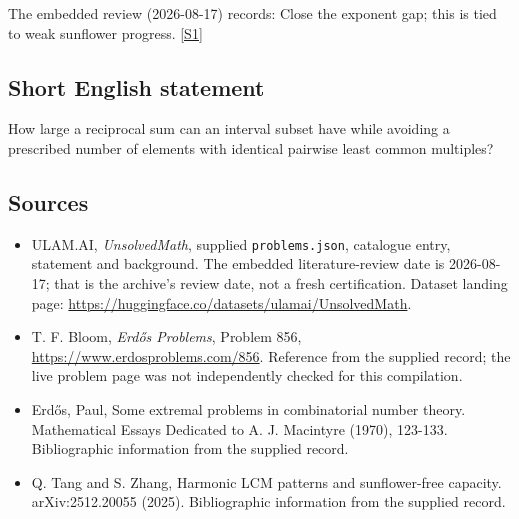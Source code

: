 \documentclass[11pt,a4paper]{article}
\newcommand{\sref}[2]{\hyperlink{source:#1:#2}{[S#2]}}
\begin{document}
The embedded review (2026-08-17) records: Close the exponent gap; this is tied to weak sunflower progress. \sref{statement}{1}

\subsection{Short English statement}

How large a reciprocal sum can an interval subset have while avoiding a prescribed number of elements with identical pairwise least common multiples?

\subsection{Sources}

{\small

\begin{itemize}

\item[\hypertarget{source:statement:1}{S1}] ULAM.AI, \emph{UnsolvedMath}, supplied \texttt{problems.json}, catalogue entry, statement and background. The embedded literature-review date is 2026-08-17; that is the archive’s review date, not a fresh certification. Dataset landing page: \url{https://huggingface.co/datasets/ulamai/UnsolvedMath}.

\item[\hypertarget{source:statement:2}{S2}] T. F. Bloom, \emph{Erdős Problems}, Problem 856, \url{https://www.erdosproblems.com/856}. Reference from the supplied record; the live problem page was not independently checked for this compilation.

\item[\hypertarget{source:statement:3}{S3}] Erd\H{o}s, Paul, Some extremal problems in combinatorial number theory. Mathematical Essays Dedicated to A. J. Macintyre (1970), 123-133. Bibliographic information from the supplied record.

\item[\hypertarget{source:statement:4}{S4}] Q. Tang and S. Zhang, Harmonic LCM patterns and sunflower-free capacity. arXiv:2512.20055 (2025). Bibliographic information from the supplied record.

\end{itemize}

}

\label{end:statement}
\end{document}
